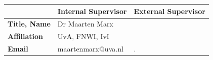 \begin{titlepage}
\begin{center}
\begin{tabular}{|l||ll|}
\hline
 & \textbf{Internal  Supervisor} & \textbf{External   Supervisor}  \\   
 \hline
\textbf{Title, Name} & Dr Maarten Marx&  \\
\textbf{Affiliation} &UvA, FNWI, IvI & \\ 
\textbf{Email} & maartenmarx@uva.nl& . \\
\hline
\end{tabular}
\end{center}




\bigskip


\end{titlepage}

